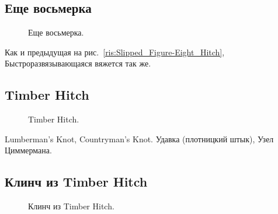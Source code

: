 \subsection{Еще восьмерка}

\begin{figure}[H]\centering
	\begin{minipage}{1\linewidth}
		\begin{center}
			\tcbox[enhanced jigsaw,colframe=black,opacityframe=0.5,opacityback=0.5]
			{\centering{}}
		\end{center}
	\end{minipage}
\caption{Еще восьмерка.}
\label{ris:Figure-Eight_2}
\end{figure}

Как и предыдущая на рис.~\ref{ris:Slipped_Figure-Eight_Hitch}, Быстроразвязывающаяся вяжется так же.

\subsection{Timber Hitch}

\begin{figure}[H]\centering
	\begin{minipage}{1\linewidth}
		\begin{center}
			\tcbox[enhanced jigsaw,colframe=black,opacityframe=0.5,opacityback=0.5]
			{\centering{}}
		\end{center}
	\end{minipage}
\caption{Timber Hitch.}
\label{ris:Timber_Hitch}
\end{figure}

Lumberman’s Knot, Countryman’s Knot. Удавка (плотницкий штык), Узел Циммермана.

\subsection{Клинч из Timber Hitch}

\begin{figure}[H]\centering
	\begin{minipage}{1\linewidth}
		\begin{center}
			\tcbox[enhanced jigsaw,colframe=black,opacityframe=0.5,opacityback=0.5]
			{\centering{}}
		\end{center}
	\end{minipage}
\caption{Клинч из Timber Hitch.}
\label{ris:Clinch_2}
\end{figure}

